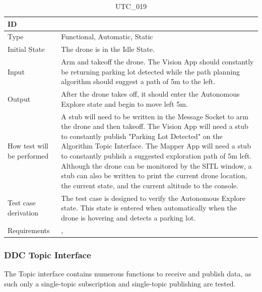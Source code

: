 \documentclass[12pt, titlepage]{article}
\begin{document}
\begin{table}[!h]
\begin{center}
\caption {UTC\_019}
\label{tab:UTC_019}
\begin{tabular}{ | m{3.2cm} | m{12.2cm} | } 
\hline
ID & \nameref{tab:UTC_019} \\ 
\hline
Type &  Functional, Automatic, Static  \\ 
\hline
Initial State & The drone is in the Idle State. \\ 
\hline
Input &  Arm and takeoff the drone. The Vision App should constantly be returning parking lot detected while the path planning algorithm should suggest a path of 5m to the left. \\ 
\hline
Output &  After the drone takes off, it should enter the Autonomous Explore state and begin to move left 5m.\\  
\hline
How test will be performed & A stub will need to be written in the Message Socket to arm the drone and then takeoff. The Vision App will need a stub to constantly publish "Parking Lot Detected" on the Algorithm Topic Interface. The Mapper App will need a stub to constantly publish a suggested exploration path of 5m left.  Although the drone can be monitored by the SITL window, a stub can also be written to print the current drone location, the current state, and the current altitude to the console.\\ 
\hline
Test case derivation &  The test case is designed to verify the Autonomous Explore state. This state is entered when automatically when the drone is hovering and detects a parking lot. \\ 
\hline
Requirements & \nameref{STA_003}, \nameref{TRANS_004} \\ 
\hline
\end{tabular}
\end{center}
\end{table}

\clearpage

\subsubsection{DDC Topic Interface}

The Topic interface contains numerous functions to receive and publish data, as such only a single-topic subscription and single-topic publishing are tested.
\end{document}
